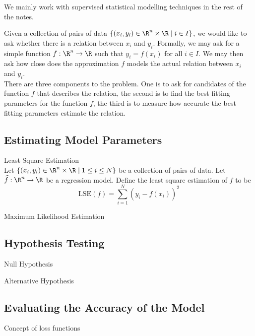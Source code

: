\documentclass[a4paper]{article}
\begin{document}
We mainly work with supervised statistical modelling techniques in the rest of the notes. 






Given a collection of pairs of data $\{(x_i,y_i)\in\R^n\times\R\;|\;i\in I\}$, we would like to ask whether there is a relation between $x_i$ and $y_i$. Formally, we may ask for a simple function $f:\R^n\to\R$ such that $y_i=f(x_i)$ for all $i\in I$. We may then ask how close does the approximation $f$ models the actual relation between $x_i$ and $y_i$. \\

There are three components to the problem. One is to ask for candidates of the function $f$ that describes the relation, the second is to find the best fitting parameters for the function $f$, the third is to measure how accurate the best fitting parameters estimate the relation. 

\subsection{Estimating Model Parameters}
\begin{defn}{Least Square Estimation}{}\\
Let $\{(x_i,y_i)\in\R^n\times\R\;|\;1\leq i\leq N\}$ be a collection of pairs of data. Let $\widehat{f}:\R^n\to\R$ be a regression model. Define the least square estimation of $f$ to be $$\text{LSE}(f)=\sum_{i=1}^N(y_i-\widehat{f}(x_i))^2$$
\end{defn}

\begin{defn}{Maximum Likelihood Estimation}{}
\end{defn}

\subsection{Hypothesis Testing}
\begin{defn}{Null Hypothesis}{}
\end{defn}

\begin{defn}{Alternative Hypothesis}{}
\end{defn}

\subsection{Evaluating the Accuracy of the Model}
Concept of loss functions
\end{document}
